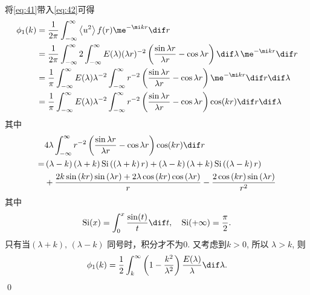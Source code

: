 \documentclass[12pt,a4]{ctexart}
\begin{document}
将\cref{eq:41}带入\cref{eq:42}可得
\begin{equation}
   \begin{aligned}
      \phi_{1}(k) & = \frac{1}{2 \pi} \int_{-\infty}^{\infty}\left\langle u^{2}\right\rangle f(r) \me^{-\mi k r} \dif r                                                                                            \\
                  & = \frac{1}{2 \pi} \int_{-\infty}^{\infty}2 \int_{-\infty}^{\infty} E(\lambda)(\lambda r)^{-2}\left(\frac{\sin \lambda r}{\lambda r}-\cos \lambda r\right)\dif \lambda \, \me^{-\mi k r} \dif r \\
                  & = \frac{1}{ \pi} \int_{-\infty}^{\infty}E(\lambda) \lambda^{-2} \int_{-\infty}^{\infty}  r^{-2}\left(\frac{\sin \lambda r}{\lambda r}-\cos \lambda r\right) \me^{-\mi k r} \dif r \dif \lambda \\
                  & = \frac{1}{ \pi} \int_{-\infty}^{\infty}E(\lambda) \lambda^{-2} \int_{-\infty}^{\infty}  r^{-2}\left(\frac{\sin \lambda r}{\lambda r}-\cos \lambda r\right) \cos(kr) \dif r \dif \lambda       \\
   \end{aligned}
\end{equation}
其中
\begin{equation}
   \begin{aligned}
        & 4\lambda\int_{-\infty}^{\infty}  r^{-2}\left(\frac{\sin \lambda r}{\lambda r}-\cos \lambda r\right) \cos(kr) \dif r                                                                                 \\
      = & \left(\lambda-k\right)\left(\lambda+k\right)\operatorname{Si}\left(\left(\lambda+k\right)r\right)+\left(\lambda-k\right)\left(\lambda+k\right)\operatorname{Si}\left(\left(\lambda-k\right)r\right) \\
        & +\frac{2k\sin\left(kr\right)\sin\left(\lambda r\right)+2\lambda \cos\left(kr\right)\cos\left(\lambda r\right)}{r}-\frac{2\cos\left(kr\right)\sin\left(\lambda r\right)}{r^2}
   \end{aligned}
\end{equation}
其中
\begin{equation}
   \mathrm{Si}(x) = \int^x_0 \frac{\sin(t)}{t} \dif t,\quad \mathrm{Si}(+\infty) = \frac{\pi}{2}.
\end{equation}
只有当$\left( \lambda + k \right),\, \left( \lambda - k \right) $ 同号时，积分才不为$0$. 又考虑到$k>0$, 所以 $\lambda > k$, 则
\begin{equation}
   \phi_{1}(k)=\frac{1}{2} \int_{k}^{\infty}\left(1-\frac{k^{2}}{\lambda^{2}}\right) \frac{E(\lambda)}{\lambda} \dif \lambda.
\end{equation}
\qed
\end{document}

